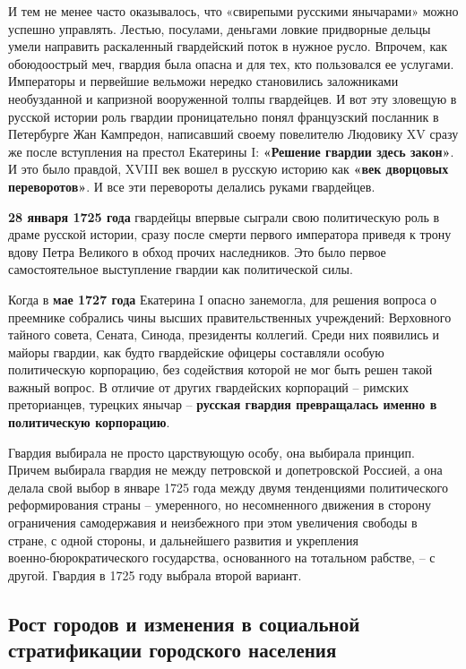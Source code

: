\documentclass{article}
\begin{document}
\hfill

И тем не менее часто оказывалось, что «свирепыми русскими янычарами» можно успешно управлять. Лестью, посулами, деньгами ловкие придворные дельцы умели направить раскаленный гвардейский поток в нужное русло. Впрочем, как обоюдоострый меч, гвардия была опасна и для тех, кто пользовался ее услугами. Императоры и первейшие вельможи нередко становились заложниками необузданной и капризной вооруженной толпы гвардейцев. И вот эту зловещую в русской истории роль гвардии проницательно понял французский посланник в Петербурге Жан Кампредон, написавший своему повелителю Людовику XV сразу же после вступления на престол Екатерины I: \textbf{«Решение гвардии здесь закон»}. И это было правдой, XVIII век вошел в русскую историю как \textbf{«век дворцовых переворотов»}. И все эти перевороты делались руками гвардейцев.

\hfill

\textbf{28 января 1725 года} гвардейцы впервые сыграли свою политическую роль в драме русской истории, сразу после смерти первого императора приведя к трону вдову Петра Великого в обход прочих наследников. Это было первое самостоятельное выступление гвардии как политической силы.

Когда в \textbf{мае 1727 года} Екатерина I опасно занемогла, для решения вопроса о преемнике собрались чины высших правительственных учреждений: Верховного тайного совета, Сената, Синода, президенты коллегий. Среди них появились и майоры гвардии, как будто гвардейские офицеры составляли особую политическую корпорацию, без содействия которой не мог быть решен такой важный вопрос. В отличие от других гвардейских корпораций – римских преторианцев, турецких янычар – \textbf{русская гвардия превращалась именно в политическую корпорацию}.

Гвардия выбирала не просто царствующую особу, она выбирала принцип. Причем выбирала гвардия не между петровской и допетровской Россией, а она делала свой выбор в январе 1725 года между двумя тенденциями политического реформирования страны – умеренного, но несомненного движения в сторону ограничения самодержавия и неизбежного при этом увеличения свободы в стране, с одной стороны, и дальнейшего развития и укрепления военно‑бюрократического государства, основанного на тотальном рабстве, – с другой. Гвардия в 1725 году выбрала второй вариант.

\subsection{Рост городов и изменения в социальной стратификации городского населения}
\end{document}
